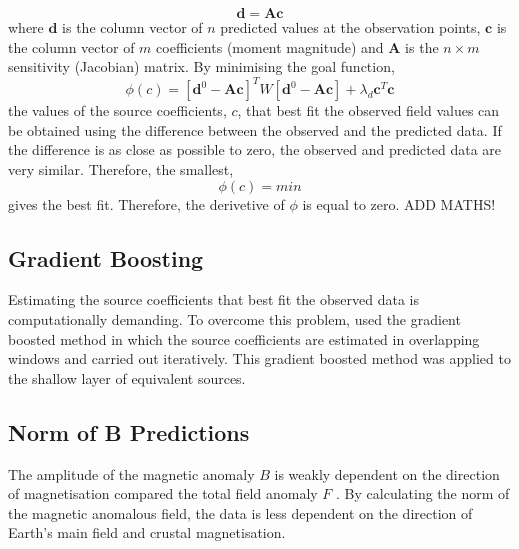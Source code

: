 \begin{equation}
    \mathbf{d} = \mathbf{Ac}
\end{equation}
where $\mathbf{d}$ is the column vector of $n$ predicted values at the observation points, $\mathbf{c}$ is the column vector of $m$ coefficients (moment magnitude) and $\mathbf{A}$ is the $n \times m$ sensitivity (Jacobian) matrix. By minimising the goal function,
\begin{equation}
    \phi(c) = [\mathbf{d}^0 - \mathbf{Ac}]^T W[\mathbf{d}^0 - \mathbf{Ac}] + \lambda_d \mathbf{c}^T\mathbf{c}
\end{equation}
the values of the source coefficients, $c$, that best fit the observed field values can be obtained using the difference between the observed and the predicted data. If the difference is as close as possible to zero, the observed and predicted data are very similar. Therefore, the smallest,
\begin{equation}
    \phi(c) = min
\end{equation}
gives the best fit. Therefore, the derivetive of $\phi$ is equal to zero.
ADD MATHS!

\subsection{Gradient Boosting}
Estimating the source coefficients that best fit the observed data is computationally demanding. To overcome this problem, \cite{SolerUieda2021} used the gradient boosted method in which the source coefficients are estimated in overlapping windows and carried out iteratively. This gradient boosted method was applied to the shallow layer of equivalent sources.

\subsection{Norm of B Predictions}
The amplitude of the magnetic anomaly $B$ is weakly dependent on the direction of magnetisation compared the total field anomaly $F$ \cite{HidalgoGato2021}. By calculating the norm of the magnetic anomalous field, the data is less dependent on the direction of Earth’s main field and crustal magnetisation.

